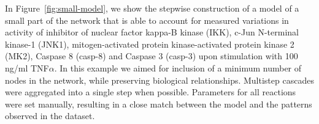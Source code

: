 \documentclass{bmcart}
\begin{document}
In Figure~\ref{fig:small-model}, we show the stepwise construction of a model of a small part of the network that is
able to account for measured variations in activity of inhibitor of nuclear factor kappa-B kinase (IKK), c-Jun N-terminal kinase-1 (JNK1),
mitogen-activated protein kinase-activated protein kinase 2 (MK2), Caspase 8 (casp-8) and Caspase 3 (casp-3) upon stimulation with 100
ng/ml TNF$\alpha$. In this example we aimed for inclusion of a minimum number of nodes in the network, while preserving biological relationships.
Multistep cascades were aggregated into a single step when possible. Parameters for all reactions were set manually, resulting in a close
match between the model and the patterns observed in the dataset.











\end{document}
